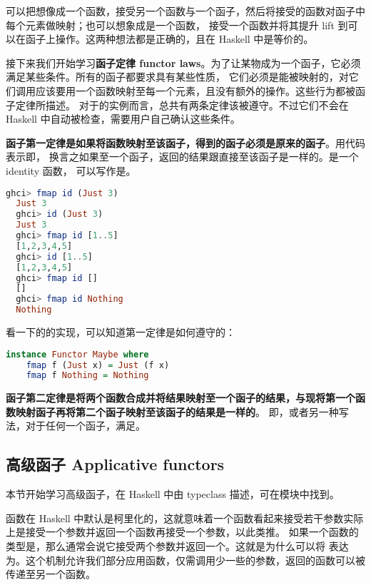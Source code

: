 \documentclass[./main.tex]{subfiles}
\begin{document}
可以把想像成一个函数，接受另一个函数与一个函子，然后将接受的函数对函子中每个元素做映射；也可以想象成是一个函数，
接受一个函数并将其提升 lift 到可以在函子上操作。这两种想法都是正确的，且在 Haskell 中是等价的。

接下来我们开始学习\textbf{函子定律 functor laws}。为了让某物成为一个函子，它必须满足某些条件。所有的函子都要求具有某些性质，
它们必须是能被映射的，对它们调用应该要用一个函数映射至每一个元素，且没有额外的操作。这些行为都被函子定律所描述。
对于的实例而言，总共有两条定律该被遵守。不过它们不会在 Haskell 中自动被检查，需要用户自己确认这些条件。

\textbf{函子第一定律是如果将函数映射至该函子，得到的函子必须是原来的函子}。用代码表示即，
换言之如果至一个函子，返回的结果跟直接至该函子是一样的。是一个 identity 函数，
可以写作是。

\begin{lstlisting}[language=Haskell]
  ghci> fmap id (Just 3)
  Just 3
  ghci> id (Just 3)
  Just 3
  ghci> fmap id [1..5]
  [1,2,3,4,5]
  ghci> id [1..5]
  [1,2,3,4,5]
  ghci> fmap id []
  []
  ghci> fmap id Nothing
  Nothing
\end{lstlisting}

看一下的的实现，可以知道第一定律是如何遵守的：

\begin{lstlisting}[language=Haskell]
  instance Functor Maybe where
    fmap f (Just x) = Just (f x)
    fmap f Nothing = Nothing
\end{lstlisting}

\textbf{函子第二定律是将两个函数合成并将结果映射至一个函子的结果，与现将第一个函数映射函子再将第二个函子映射至该函子的结果是一样的}。
即，或者另一种写法，对于任何一个函子，满足。

\subsection*{高级函子 Applicative functors}

本节开始学习高级函子，在 Haskell 中由  typeclass 描述，可在模块中找到。

函数在 Haskell 中默认是柯里化的，这就意味着一个函数看起来接受若干参数实际上是接受一个参数并返回一个函数再接受一个参数，以此类推。
如果一个函数的类型是，那么通常会说它接受两个参数并返回一个。这就是为什么可以将
表达为。这个机制允许我们部分应用函数，仅需调用少一些的参数，返回的函数可以被传递至另一个函数。
\end{document}
